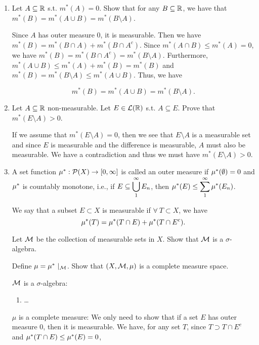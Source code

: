 \documentclass[12pt]{article}
\begin{document}
\begin{enumerate}


    \item Let $A \subseteq \mathbb{R}$ s.t. $m^*(A) = 0$. Show that for any $B \subseteq \mathbb{R}$, we have that $m^*(B) = m^*(A \cup B) = m^*(B \setminus A)$. 
    \begin{mybox}
        Since $A$ has outer measure 0, it is measurable.
        Then we have $m^*(B)=m^*(B\cap A)+m^*(B\cap A^c)$.
        Since $m^*(A\cap B)\leq m^*(A)=0$, we have
        $m^*(B)=m^*(B\cap A^c)=m^*(B\setminus A)$.
        Furthermore, $m^*(A\cup B)\leq m^*(A)+m^*(B)
        =m^*(B)$ and $m^*(B)=m^*(B\setminus A)\leq
        m^*(A\cup B)$. Thus, we have

        $$m^*(B) = m^*(A \cup B) = m^*(B \setminus A).$$
    \end{mybox}
    \item Let $A \subseteq \mathbb{R}$ non-measurable. Let $ E \in \mathcal{L}(\mathbb{R})$ s.t. $A \subseteq E$. Prove that $m^*(E \setminus A) > 0$. 
    \begin{mybox}
        If we assume that $m^*(E\setminus A)=0$,
        then we see that $E\setminus A$ is a measurable
        set and since $E$ is measurable and the difference
        is measurable, $A$ must also
        be measurable. We have a contradiction and thus
        we must have $m^*(E\setminus A)>0$.
    \end{mybox}
    \item A set function $\mu^*: \mathcal{P}(X) \to [0,\infty]$ is called an outer measure if $\mu^*(\emptyset) = 0$ and $\mu^*$ is countably monotone, i.e., if $\displaystyle E \subseteq \bigcup_1^{\infty} E_n$, then  $\displaystyle \mu^*(E) \leq \sum_1^{\infty} \mu^*(E_n)$.
    
    We say that a subset $E \subset X$ is measurable if $\forall \ T \subset X$, we have
    $$\mu^*(T) = \mu^*(T \cap E) + \mu^*(T \cap E^c).$$
    
    Let $\mathcal{M}$ be the collection of measurable sets in $X$. Show that $\mathcal{M}$ is a $\sigma$-algebra.
    
    Define $\mu = \mu^* \ |_{\mathcal{M}}$. Show that $(X, \mathcal{M}, \mu)$ is a complete measure space. 
    \begin{mybox}
        $\mathcal{M}$ is a $\sigma$-algebra:
        \begin{enumerate}
            \item \ldots
        \end{enumerate}
        
        \vspace*{2mm}
        $\mu$ is a complete measure: We only need to show
        that if a set $E$ has outer measure 0, then it is
        measurable. We have, for any set $T$, since
        $T\supset T\cap E^c$ and $\mu^*(T\cap E)\leq\mu^*(E)=0$,


\end{mybox}
\end{enumerate}
\end{document}
